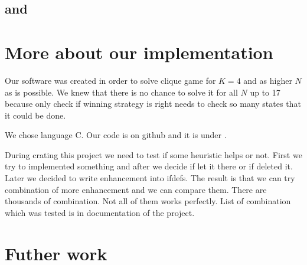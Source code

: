 \subsection{ and  }

\subsection{}

\section{ More about our implementation }

Our software was created in order to solve clique game for $K=4$ and as higher
$N$ as is possible. We knew that there is no chance to solve it for all $N$ up
to 17 because only check if winning strategy is right needs to check so many
states that it could be done. 
 
We chose language C. Our code is on github  and
it is under .

During crating this project we need to test if some heuristic helps or not.
First we try to implemented something and after we decide if let it there or if
deleted it. Later we decided to write enhancement into ifdefs. The result is
that we can try combination of more enhancement and we can compare them.
There are thousands of combination. Not all of them works perfectly. List
of combination which was tested is in documentation of the project. 

\subsection{  }


\section{ Futher work }

